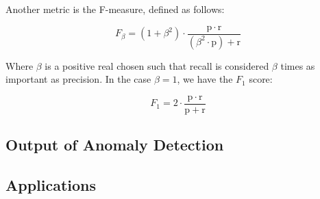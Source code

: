 Another metric is the F-measure, defined as follows:

\begin{equation}
	F_\beta = (1 + \beta^2) \cdot \frac{\mathrm{p} \cdot \mathrm{r}}{(\beta^2 \cdot \mathrm{p}) + \mathrm{r}}
\end{equation}

Where $\beta$ is a positive real chosen such that recall is considered $\beta$ times as important as precision. In the case $\beta = 1$, we have the $F_1$ score:

\begin{equation}
	F_1 = 2 \cdot \frac{\mathrm{p} \cdot \mathrm{r}}{\mathrm{p} + \mathrm{r}}
\end{equation}



\subsection{Output of Anomaly Detection}

\subsection{Applications}


